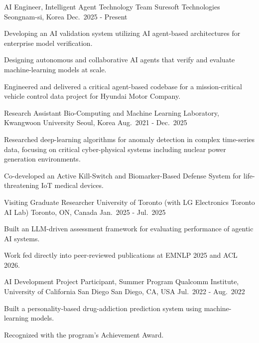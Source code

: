 \documentclass[11pt, letterpaper]{awesome-cv}
\begin{document}
\vspace{0pt plus 8\baselineskip}\vspace{0pt plus -8\baselineskip}
\begin{cventries}
  \cventry
    {AI Engineer, Intelligent Agent Technology Team}
    {Suresoft Technologies}
    {Seongnam-si, Korea}
    {Dec.\ 2025 - Present}
    {
      \begin{cvitems}
        \item {Developing an AI validation system utilizing AI agent-based architectures for enterprise model verification.}
        \item {Designing autonomous and collaborative AI agents that verify and evaluate machine-learning models at scale.}
        \item {Engineered and delivered a critical agent-based codebase for a mission-critical vehicle control data project for Hyundai Motor Company.}
      \end{cvitems}
    }
  \cventry
    {Research Assistant}
    {Bio-Computing and Machine Learning Laboratory, Kwangwoon University}
    {Seoul, Korea}
    {Aug.\ 2021 - Dec.\ 2025}
    {
      \begin{cvitems}
        \item {Researched deep-learning algorithms for anomaly detection in complex time-series data, focusing on critical cyber-physical systems including nuclear power generation environments.}
        \item {Co-developed an Active Kill-Switch and Biomarker-Based Defense System for life-threatening IoT medical devices.}
      \end{cvitems}
    }
  \cventry
    {Visiting Graduate Researcher}
    {University of Toronto (with LG Electronics Toronto AI Lab)}
    {Toronto, ON, Canada}
    {Jan.\ 2025 - Jul.\ 2025}
    {
      \begin{cvitems}
        \item {Built an LLM-driven assessment framework for evaluating performance of agentic AI systems.}
        \item {Work fed directly into peer-reviewed publications at EMNLP 2025 and ACL 2026.}
      \end{cvitems}
    }
  \cventry
    {AI Development Project Participant, Summer Program}
    {Qualcomm Institute, University of California San Diego}
    {San Diego, CA, USA}
    {Jul.\ 2022 - Aug.\ 2022}
    {
      \begin{cvitems}
        \item {Built a personality-based drug-addiction prediction system using machine-learning models.}
        \item {Recognized with the program's Achievement Award.}
      \end{cvitems}
    }
\end{cventries}
\end{document}
